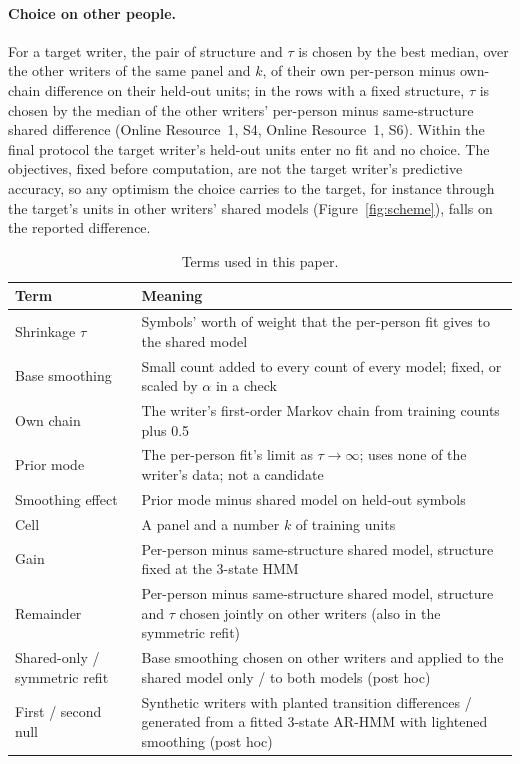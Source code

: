 \documentclass[pdflatex,sn-basic]{sn-jnl}
\newcommand{\Sref}[1]{Online Resource~1, S#1}
\newcommand{\hmmthree}{\mbox{3-state} HMM}
\newcommand{\arthree}{\mbox{3-state} \mbox{AR-HMM}}
\begin{document}
\paragraph{Choice on other people.} For a target writer, the pair of structure and $\tau$ is chosen by the best median, over the other writers of the same panel and $k$, of their own per-person minus own-chain difference on their held-out units; in the rows with a fixed structure, $\tau$ is chosen by the median of the other writers' per-person minus same-structure shared difference (\Sref{4}, \Sref{6}). Within the final protocol the target writer's held-out units enter no fit and no choice. The objectives, fixed before computation, are not the target writer's predictive accuracy, so any optimism the choice carries to the target, for instance through the target's units in other writers' shared models (Figure~\ref{fig:scheme}), falls on the reported difference.

\begin{table}[t]
\centering
\caption{Terms used in this paper.}
\label{tab:terms}
\small
\begin{tabular}{@{}>{\raggedright}p{2.6cm} >{\raggedright\arraybackslash}p{9.2cm}@{}}
\toprule
Term & Meaning \\
\midrule
Shrinkage $\tau$ & Symbols' worth of weight that the per-person fit gives to the shared model \\
Base smoothing & Small count added to every count of every model; fixed, or scaled by $\alpha$ in a check \\
Own chain & The writer's first-order Markov chain from training counts plus 0.5 \\
Prior mode & The per-person fit's limit as $\tau\to\infty$; uses none of the writer's data; not a candidate \\
Smoothing effect & Prior mode minus shared model on held-out symbols \\
Cell & A panel and a number $k$ of training units \\
Gain & Per-person minus same-structure shared model, structure fixed at the \hmmthree{} \\
Remainder & Per-person minus same-structure shared model, structure and $\tau$ chosen jointly on other writers (also in the symmetric refit) \\
Shared-only / symmetric refit & Base smoothing chosen on other writers and applied to the shared model only / to both models (post hoc) \\
First / second null & Synthetic writers with planted transition differences / generated from a fitted \arthree{} with lightened smoothing (post hoc) \\
\bottomrule
\end{tabular}
\end{table}
\end{document}
